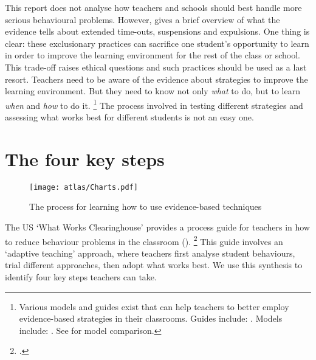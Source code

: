 \documentclass[FrontPage]{grattan}
\begin{document}
This report does not analyse how teachers and schools should best handle more serious behavioural problems. However,  gives a brief overview of what the evidence tells about extended time-outs, suspensions and expulsions. One thing is clear: these exclusionary practices can sacrifice one student’s opportunity to learn in order to improve the learning environment for the rest of the class or school. This trade-off raises ethical questions and such practices should be used as a last resort.
\clearpage
{}\label{sec:part-b-how-to-implement}
\vspace*{0.5\baselineskip}
Teachers need to be aware of the evidence about strategies to improve the learning environment. But they need to know not only \emph{what} to do, but to learn \emph{when} and \emph{how} to do it.%
    \footnote{Various models and guides exist that can help teachers to better employ evidence-based strategies in their classrooms. Guides include: \textcites{Epstein2008ReducingBehaviorProblems}{Greenberg2014TrainingOurFuture}{Marzano2003ClassroomManagementWorks}. Models include: \textcites{Alberto2012AppliedBehaviorAnalysis}{Evertson1995ClassroomOrganizationManagement}{PBIS2017PositiveBehavioralInterventionsSupports}{Rogers2015ClassroomBehaviourPractical}. See \textcites{EvertsonWeinstein2013HandbookClassroomManagement}{ONeillStephenson2014EvidenceBasedClassroom} for model comparison.}
The process involved in testing different strategies and assessing what works best for different students is not an easy one.
\section{The four key steps}\label{sec:four-key-steps}

\begin{figure}
\caption{The process for learning how to use evidence-based techniques\label{fig:what-teachers-can-do}}
\texttt{[image: atlas/Charts.pdf]}
\end{figure}

The US `What Works Clearinghouse’ provides a process guide for teachers in how to reduce behaviour problems in the classroom ().%
    \footcite{Epstein2008ReducingBehaviorProblems}
This guide involves an `adaptive teaching’ approach, where teachers first analyse student behaviours, trial different approaches, then adopt what works best. We use this synthesis to identify four key steps teachers can take.
\end{document}
